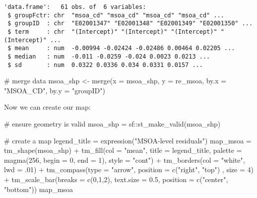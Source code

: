 \documentclass[
  letterpaper,
  krantz2]{style/krantz}
\newenvironment{Shaded}{\begin{snugshade}}{\end{snugshade}}
\newcommand{\AttributeTok}[1]{\textcolor[rgb]{0.40,0.45,0.13}{#1}}
\newcommand{\CommentTok}[1]{\textcolor[rgb]{0.37,0.37,0.37}{#1}}
\newcommand{\DecValTok}[1]{\textcolor[rgb]{0.68,0.00,0.00}{#1}}
\newcommand{\FloatTok}[1]{\textcolor[rgb]{0.68,0.00,0.00}{#1}}
\newcommand{\FunctionTok}[1]{\textcolor[rgb]{0.28,0.35,0.67}{#1}}
\newcommand{\NormalTok}[1]{\textcolor[rgb]{0.00,0.23,0.31}{#1}}
\newcommand{\OtherTok}[1]{\textcolor[rgb]{0.00,0.23,0.31}{#1}}
\newcommand{\SpecialCharTok}[1]{\textcolor[rgb]{0.37,0.37,0.37}{#1}}
\newcommand{\StringTok}[1]{\textcolor[rgb]{0.13,0.47,0.30}{#1}}
\begin{document}
\begin{verbatim}
'data.frame':   61 obs. of  6 variables:
 $ groupFctr: chr  "msoa_cd" "msoa_cd" "msoa_cd" "msoa_cd" ...
 $ groupID  : chr  "E02001347" "E02001348" "E02001349" "E02001350" ...
 $ term     : chr  "(Intercept)" "(Intercept)" "(Intercept)" "(Intercept)" ...
 $ mean     : num  -0.00994 -0.02424 -0.02486 0.00464 0.02205 ...
 $ median   : num  -0.011 -0.0259 -0.024 0.0023 0.0213 ...
 $ sd       : num  0.0322 0.0336 0.034 0.0331 0.0157 ...
\end{verbatim}

\begin{Shaded}
\begin{Highlighting}[]
\CommentTok{\# merge data}
\NormalTok{msoa\_shp }\OtherTok{\textless{}{-}} \FunctionTok{merge}\NormalTok{(}\AttributeTok{x =}\NormalTok{ msoa\_shp, }\AttributeTok{y =}\NormalTok{ re\_msoa, }\AttributeTok{by.x =} \StringTok{"MSOA\_CD"}\NormalTok{, }\AttributeTok{by.y =} \StringTok{"groupID"}\NormalTok{)}
\end{Highlighting}
\end{Shaded}

Now we can create our map:

\begin{Shaded}
\begin{Highlighting}[]
\CommentTok{\# ensure geometry is valid}
\NormalTok{msoa\_shp }\OtherTok{=}\NormalTok{ sf}\SpecialCharTok{::}\FunctionTok{st\_make\_valid}\NormalTok{(msoa\_shp)}

\CommentTok{\# create a map}
\NormalTok{legend\_title }\OtherTok{=} \FunctionTok{expression}\NormalTok{(}\StringTok{"MSOA{-}level residuals"}\NormalTok{)}
\NormalTok{map\_msoa }\OtherTok{=} \FunctionTok{tm\_shape}\NormalTok{(msoa\_shp) }\SpecialCharTok{+}
  \FunctionTok{tm\_fill}\NormalTok{(}\AttributeTok{col =} \StringTok{"mean"}\NormalTok{, }\AttributeTok{title =}\NormalTok{ legend\_title, }\AttributeTok{palette =} \FunctionTok{magma}\NormalTok{(}\DecValTok{256}\NormalTok{, }\AttributeTok{begin =} \DecValTok{0}\NormalTok{, }\AttributeTok{end =} \DecValTok{1}\NormalTok{), }\AttributeTok{style =} \StringTok{"cont"}\NormalTok{) }\SpecialCharTok{+} 
  \FunctionTok{tm\_borders}\NormalTok{(}\AttributeTok{col =} \StringTok{"white"}\NormalTok{, }\AttributeTok{lwd =}\NormalTok{ .}\DecValTok{01}\NormalTok{)  }\SpecialCharTok{+} 
  \FunctionTok{tm\_compass}\NormalTok{(}\AttributeTok{type =} \StringTok{"arrow"}\NormalTok{, }\AttributeTok{position =} \FunctionTok{c}\NormalTok{(}\StringTok{"right"}\NormalTok{, }\StringTok{"top"}\NormalTok{) , }\AttributeTok{size =} \DecValTok{4}\NormalTok{) }\SpecialCharTok{+} 
  \FunctionTok{tm\_scale\_bar}\NormalTok{(}\AttributeTok{breaks =} \FunctionTok{c}\NormalTok{(}\DecValTok{0}\NormalTok{,}\DecValTok{1}\NormalTok{,}\DecValTok{2}\NormalTok{), }\AttributeTok{text.size =} \FloatTok{0.5}\NormalTok{, }\AttributeTok{position =}  \FunctionTok{c}\NormalTok{(}\StringTok{"center"}\NormalTok{, }\StringTok{"bottom"}\NormalTok{)) }
\NormalTok{map\_msoa}
\end{Highlighting}
\end{Shaded}
\end{document}

